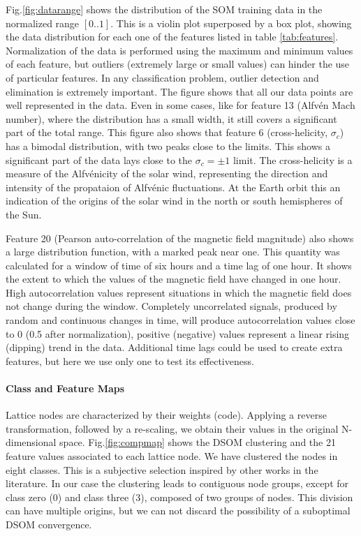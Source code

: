 Fig.\ref{fig:datarange} shows the distribution of the SOM training data in the normalized range $\left[0..1\right]$. This is a violin plot superposed by a box plot, showing the data distribution for each one of the features listed in table \ref{tab:features}. Normalization of the data is performed using the maximum and minimum values of each feature, but outliers (extremely large or small values) can hinder the use of particular features. In any classification problem, outlier detection and elimination is extremely important. The figure shows that all our data points are well represented in the data. Even in some cases, like for feature 13 (Alfv\'en Mach number), where the distribution has a small width, it still covers a significant part of the total range. This figure also shows that feature 6 (cross-helicity, $\sigma_c$) has a bimodal distribution, with two peaks close to the limits. This shows a significant part of the data lays close to the $\sigma_c = \pm 1$ limit. The cross-helicity is a measure of the Alfv\'enicity of the solar wind, representing the direction and intensity of the propataion of Alfv\'enic fluctuations. At the Earth orbit this an indication of the origins of the solar wind in the north or south hemispheres of the Sun.

Feature 20 (Pearson auto-correlation of the magnetic field magnitude) also shows a large distribution function, with a marked peak near one. This quantity was calculated for a window of time of six hours and a time lag of one hour. It shows the extent to which the values of the magnetic field have changed in one hour. High autocorrelation values represent situations in which the magnetic field does not change during the window. Completely uncorrelated signals, produced by random and continuous changes in time, will produce autocorrelation values close to 0 (0.5 after normalization), positive (negative) values represent a linear rising (dipping) trend in the data. Additional time lags could be used to create extra features, but here we use only one to test its effectiveness.

\paragraph{Class and Feature Maps}

Lattice nodes are characterized by their weights (code). Applying a reverse transformation, followed by a re-scaling, we obtain their values in the original N-dimensional space. Fig.\ref{fig:compmap} shows the DSOM clustering and the 21 feature values associated to each lattice node. We have clustered the nodes in eight classes. This is a subjective selection inspired by other works in the literature. In our case the clustering leads to contiguous node groups, except for class zero (0) and class three (3), composed of two groups of nodes. This division can have multiple origins, but we can not discard the possibility of a suboptimal DSOM convergence.

